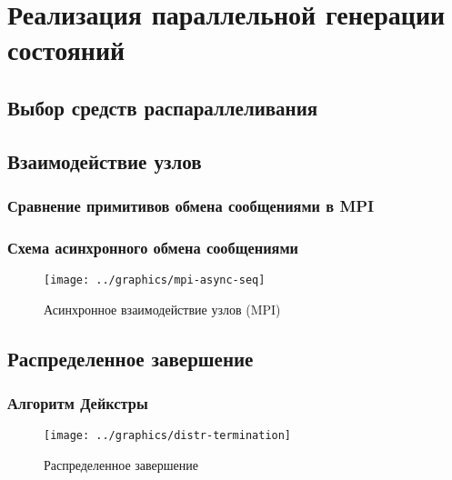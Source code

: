 \chapter{Реализация параллельной генерации состояний}
\label{cha:parmpi}

\section{Выбор средств распараллеливания}
\label{sec:paral-selection}

\section{Взаимодействие узлов}
\label{sec:mpi-interaction}

\subsection{Сравнение примитивов обмена сообщениями в MPI}
\label{sec:mpi-primitives}

\subsection{Схема асинхронного обмена сообщениями}
\label{sec:async-mpi-queue}

\begin{figure}[ht]
  \centering
  \texttt{[image: ../graphics/mpi-async-seq]}  
  \caption{Асинхронное взаимодействие узлов (MPI)}
  \label{fig:mpi-async-seq}
\end{figure}

\section{Распределенное завершение}
\label{sec:distributed-termination}

\subsection{Алгоритм Дейкстры}
\label{sec:distr-term-dijkstra}

\begin{figure}[ht]
  \centering
  \texttt{[image: ../graphics/distr-termination]}  
  \caption{Распределенное завершение}
\label{fig:dist-term}
\end{figure}

